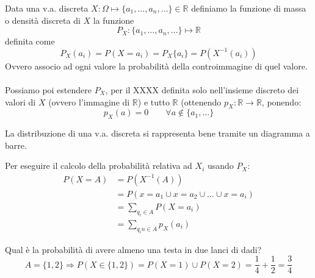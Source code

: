 \begin{definition}
	Data una v.a. discreta $X: \Omega \mapsto \{a_1, \ldots, a_n, \ldots\} \in \mathbb{R}$ definiamo la funzione di massa o densità discreta di $X$ la funzione
	\begin{equation*}
		P_X: \{a_1, \ldots, a_n, \ldots\} \mapsto \mathbb{R}
	\end{equation*}
	definita come
	\begin{equation}
		P_X(a_i) = P(X=a_i) = P_X\{a_i\}=P(X^{-1}(a_i))
	\end{equation}
	Ovvero associo ad ogni valore la probabilità della controimmagine di quel valore.\\\\
	Possiamo poi estendere $P_X$, per il XXXX definita solo nell'insieme discreto dei valori di $X$ (ovvero l'immagine di $\mathbb{R}$) e tutto $\mathbb{R}$ (ottenendo $p_X: \mathbb{R} \to \mathbb{R}$, ponendo:
	\begin{equation}
		p_X(a)=0 \qquad \forall a \notin \{a_1, \ldots\}
	\end{equation}
\end{definition}

\begin{note}
	La distribuzione di una v.a. discreta si rappresenta bene tramite un diagramma a barre.
\end{note}

Per eseguire il calcolo della probabilità relativa ad $X_i$ usando $P_X$:
\begin{align*}
	P(X=A) & = P(X^{-1}(A)) \\
	& = P(x=a_1 \cup x=a_2 \cup \ldots \cup x=a_i) \\
	& = \sum_{q_i \in A}P(X=a_i) \\
	& = \sum_{q_in \in A} p_X(a_i)
\end{align*}

\begin{example}
	Qual è la probabilità di avere almeno una testa in due lanci di dadi?
	\begin{equation*}
		A=\{1,2\} \Longrightarrow P(X\in\{1,2\}) = P(X=1) \cup P(X=2) = \frac{1}{4} + \frac{1}{2} = \frac{3}{4}
	\end{equation*}
\end{example}

